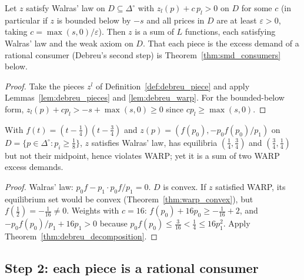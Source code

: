 \begin{theorem}
\label{thm:debreu_decomposition}
\leanok
{}
Let $z$ satisfy Walras' law on $D \subseteq \Delta^\circ$ with $z_l(p) + c\,p_l > 0$ on $D$ for some $c$ (in particular if $z$
is bounded below by $-s$ and all prices in $D$ are at least $\varepsilon > 0$, taking $c = \max(s,0)/\varepsilon$). Then $z$
is a sum of $L$ functions, each satisfying Walras' law and the weak axiom on $D$. That each piece is the excess demand
of a rational consumer (Debreu's second step) is Theorem~\ref{thm:smd_consumers} below.
\end{theorem}
\begin{proof}
\leanok
Take the pieces $z^l$ of Definition~\ref{def:debreu_piece} and apply Lemmas~\ref{lem:debreu_pieces} and
\ref{lem:debreu_warp}. For the bounded-below form, $z_l(p) + c p_l > -s + \max(s,0) \ge 0$ since $c p_l \ge \max(s, 0)$.
\end{proof}

\begin{theorem}
\label{thm:zbad_smd}
\leanok
{}
With $f(t) = (t - \frac14)(t - \frac34)$ and $z(p) = (f(p_0), -p_0 f(p_0)/p_1)$ on
$D = \{p \in \Delta^\circ : p_i \ge \frac18\}$, $z$ satisfies Walras' law, has equilibria $(\frac14, \frac34)$ and
$(\frac34, \frac14)$ but not their midpoint, hence violates WARP; yet it is a sum of two WARP excess demands.
\end{theorem}
\begin{proof}
\leanok
Walras' law: $p_0 f - p_1 \cdot p_0 f/p_1 = 0$. $D$ is convex. If $z$ satisfied WARP, its equilibrium set would be convex
(Theorem~\ref{thm:warp_convex}), but $f(\frac12) = -\frac1{16} \ne 0$. Weights with $c = 16$: $f(p_0) + 16 p_0 \ge -\frac1{16} + 2$,
and $-p_0 f(p_0)/p_1 + 16 p_1 > 0$ because $p_0 f(p_0) \le \frac3{16} < \frac14 \le 16 p_1^2$. Apply
Theorem~\ref{thm:debreu_decomposition}.
\end{proof}

\subsection{Step 2: each piece is a rational consumer}
\label{sec:smd_consumers}

